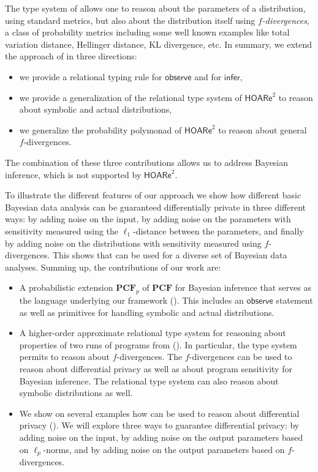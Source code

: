 \documentclass{sig-alternate-05-2015}
\theoremstyle{plain}
\theoremstyle{definition}
\theoremstyle{corollary}
\def\pcf{\ensuremath{\mathbf{PCF}}\xspace}
\def\pcfp{\ensuremath{\mathbf{PCF}_{p}}\xspace}
\newcommand{\fdiv}{\ensuremath{f}}
\begin{document}
The  type system of \THESYSTEM allows one to reason about the parameters of a
distribution, using standard metrics, but also about the distribution itself
using \emph{\fdiv-divergences}, a class of probability metrics including some
well known examples like total variation distance, Hellinger distance, KL
divergence, etc.  In summary, we extend the approach of  \THESYSTEM in three
directions:
\begin{itemize}
\item  we provide a relational typing rule for $\mathsf{observe}$ and for $\mathsf{infer}$, 
\item we provide a generalization of the relational type system of $\mathsf{HOARe}^2$ to reason about symbolic
and actual distributions, 
\item we generalize the probability polymonad of $\mathsf{HOARe}^2$ to reason about general
$f$-divergences.
\end{itemize}
The combination of these three contributions allows us to address Bayesian
inference, which is not supported by $\mathsf{HOARe}^2$.

To illustrate the different features of our approach we show how different basic
Bayesian data analysis can be guaranteed differentially private in
three different ways: by adding noise on the input, by adding noise on
the parameters with sensitivity measured using the $\ell_1$-distance
between the parameters, and finally by adding noise on the
distributions with sensitivity measured using \fdiv-divergences.
This shows that \THESYSTEM can be used for a diverse set of Bayesian data analyses.
Summing up, the contributions of our work are:
\begin{itemize}
\item  A probabilistic extension \pcfp of \pcf for Bayesian inference that
  serves as the language underlying our framework \THESYSTEM (). This
  includes an $\mathsf{observe}$ statement as well as primitives for handling symbolic and actual distributions.
\item A higher-order approximate relational type system
  for reasoning about properties of two runs of programs from \THESYSTEM (). In particular,
  the type system permits to reason about \fdiv-divergences. The \fdiv-divergences can be used to reason
  about differential privacy as well as about program sensitivity for
  Bayesian inference. The relational type system can also reason about symbolic distributions as well.
\item We show on several examples how \THESYSTEM can be used to reason
  about differential privacy (). We will explore three ways to guarantee
  differential privacy: by adding noise on the input, by adding noise
  on the output parameters based on $\ell_p$-norms, and by adding noise on the
  output parameters based on \fdiv-divergences.
\end{itemize}
\end{document}
